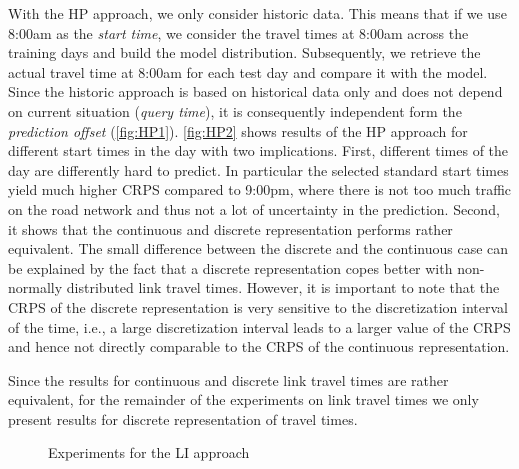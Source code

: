 With the HP approach, we only consider historic data. This means that if we use 8:00am as the \textit{start time}, we consider the travel times at 8:00am across the training days and build the model distribution. Subsequently, we retrieve the actual travel time at 8:00am for each test day and compare it with the model. Since the historic approach is based on historical data only and does not depend on current situation (\textit{query time}), it is consequently independent form the \textit{prediction offset} (\cref{fig:HP1}). \cref{fig:HP2} shows results of the HP approach for different start times in the day with two implications. First, different times of the day are differently hard to predict. In particular the selected standard start times yield much higher CRPS compared to 9:00pm, where there is not too much traffic on the road network and thus not a lot of uncertainty in the prediction.  Second, it shows that the continuous and discrete representation performs rather equivalent. The small difference between the discrete and the continuous case can be explained by the fact that a discrete representation copes better with non-normally distributed link travel times. However, it is important to note that the CRPS of the discrete representation is very sensitive to the discretization interval of the time, i.e., a large discretization interval leads to a larger value of the CRPS and hence not directly comparable to the CRPS of the continuous representation.

Since the results for continuous and discrete link travel times are rather equivalent, for the remainder of the experiments on link travel times we only present results for discrete representation of travel times.

\begin{figure}[h]
    \centering
    \caption{Experiments for the LI approach}\label{fig:LI}
\end{figure}



